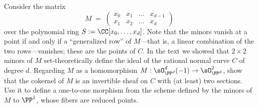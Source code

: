 \begin{exercise}
 Consider the matrix
 $$
M \; = \; \begin{pmatrix}
x_0 & x_1 & \dots & x_{d-1} \\
x_1 & x_2 & \dots & x_d
\end{pmatrix}
$$
over the polynomial ring $S:=\CC[x_0,\dots, x_d]$. Note that the minors vanish at a point if and only if
a ``generalized row'' of $M$---that is, a linear combination of the two rows---vanishes; these are the points
of $C$.
In the text we showed that $2\times 2$ minors of $M$ set-theoretically define the ideal of the rational normal curve
$C$ of degree $d$. Regarding $M$ as a homomorphism $M: \sO_{\PP^d}^d(-1) \to \sO_{\PP^d}^2$, show that the  cokernel of
$M$ is an invertible sheaf on $C$ with (at least) two sections. Use it to define a one-to-one morphism from the scheme defined by the minors of $M$ to $\PP^1$, whose fibers are reduced points.
\end{exercise}




